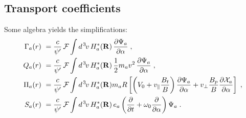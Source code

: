 \subsection{Transport coefficients}

Some algebra yields the simplifications:
%
\begin{align}
\Gamma_a(r) &~= \frac{c}{\psi^\prime} \, {\cal F} \int d^{\hskip 1pt 3} \hskip -1pt v \, H_a^*(\mathbf{R}) \, 
  \frac{\partial\Psi_a}{\partial\alpha} \; , 
 \label{eq.flux1}\\
Q_a(r) &~= \frac{c}{\psi^\prime} \, {\cal F} \int d^{\hskip 1pt 3} \hskip -1pt v \, H_a^*(\mathbf{R}) \, 
  \frac{1}{2} m_a v^2 \,
  \frac{\partial\Psi_a}{\partial\alpha} \; , 
 \label{eq.flux2} \\
\Pi_a(r) &~= \frac{c}{\psi^\prime} \, 
   {\cal F} \int d^{\hskip 1pt 3} \hskip -1pt v \, H_a^*(\mathbf{R}) m_a R \left[ 
   \left( V_0 + v_\parallel \frac{B_t}{B} \right) \frac{\partial\Psi_a}{\partial\alpha} 
+ v_\perp \frac{B_p}{B} \frac{\partial\mathcal{X}_a}{\partial\alpha} 
 \right] \; , 
 \label{eq.flux3}  \\
S_a(r) &~= \frac{c}{\psi^\prime} \, 
  {\cal F} \int d^{\hskip 1pt 3} \hskip -1pt v \, H_a^*(\mathbf{R}) \, e_a 
  \left( \frac{\partial}{\partial t} + 
  \omega_0 \frac{\partial}{\partial \alpha} \right) \Psi_a \; .
  \label{eq.flux4}  
\end{align}
